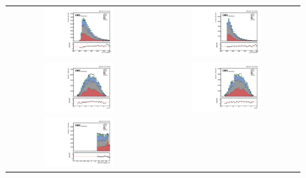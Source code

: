 \begin{figure}[t]
  \centering
  \begin{tabular}{cc}
    \includegraphics[width=0.5\textwidth]{Figures/dataMC_trig_antiTau21/pt_j0.pdf} &
    \includegraphics[width=0.5\textwidth]{Figures/dataMC_trig_antiTau21/pt_j1.pdf} \\
     \includegraphics[width=0.5\textwidth]{Figures/dataMC_trig_antiTau21/eta_j0.pdf} &
    \includegraphics[width=0.5\textwidth]{Figures/dataMC_trig_antiTau21/eta_j1.pdf} \\
     \includegraphics[width=0.5\textwidth]{Figures/dataMC_trig_antiTau21/doubleSV_j0.pdf} &

\end{tabular}
\end{figure}
